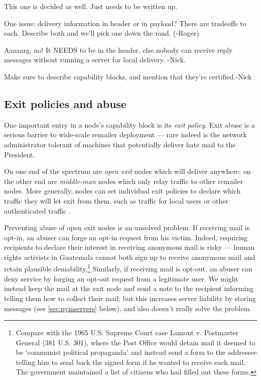 \documentclass{llncs}
\begin{document}
This one is decided as well. Just needs to be written up.

One issue: delivery information in header or in payload?
There are tradeoffs to each. Describe both and we'll pick one down the
road. (-Roger)

Aaaaarg, no!  It NEEDS to be in the header, else nobody can receive
reply messages without running a server for local delivery. -Nick.

Make sure to describe capability blocks, and mention that they're
certified.-Nick

\subsection{Exit policies and abuse}

One important entry in a node's capability block is its \emph{exit
policy}. Exit abuse is a serious barrier to wide-scale remailer deployment
--- rare indeed is the network administrator tolerant of machines that
potentially deliver hate mail to the President.

On one end of the spectrum are \emph{open exit} nodes which will
deliver anywhere; on the other end are \emph{middle-man} nodes which
only relay traffic to other remailer nodes. More generally, nodes can
set individual exit policies to declare which traffic they will let
exit from them, such as traffic for local users or other authenticated
traffic \cite{onion-discex00}.

Preventing abuse of open exit nodes is an unsolved problem. If
receiving mail is opt-in, an abuser can forge an opt-in request from
his victim. Indeed, requiring recipients to declare their interest
in receiving anonymous mail is risky --- human rights activists in
Guatemala cannot both sign up to receive anonymous mail and retain
plausible deniability.\footnote{
  Compare with the 1965 U.S. Supreme Court case Lamont v. Postmaster
  General (381 U.S. 301), where the Post Office would detain mail it
  deemed to be `communist political propaganda' and instead send a form
  to the addressee telling him to send back the signed form if he wanted
  to receive such mail. The government maintained a list of citizens
  who had filled out these forms.
} Similarly, if receiving mail is opt-out, an abuser can deny service
by forging an opt-out request from a legitimate user. We might instead
keep the mail at the exit node and send a note to the recipient
informing telling them how to collect their mail; but this increases
server liability by storing messages (see \ref{sec:nymservers} below),
and also doesn't really solve the problem.
\end{document}
